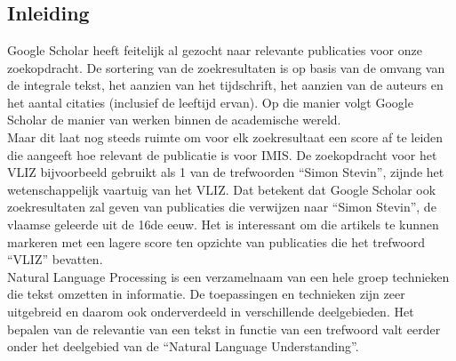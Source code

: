 
\chapter{}%
\label{ch:natural_language_processing}

\section{Inleiding}
Google Scholar heeft feitelijk al gezocht naar relevante publicaties voor onze zoekopdracht. De sortering van de zoekresultaten is op basis van de omvang van de integrale tekst, het aanzien van het tijdschrift, het aanzien van de auteurs en het aantal citaties (inclusief de leeftijd ervan). Op die manier volgt Google Scholar de manier van werken binnen de academische wereld.\\
Maar dit laat nog steeds ruimte om voor elk zoekresultaat een score af te leiden die aangeeft hoe relevant de publicatie is voor IMIS. De zoekopdracht voor het VLIZ bijvoorbeeld gebruikt als 1 van de trefwoorden ``Simon Stevin'', zijnde het wetenschappelijk vaartuig van het VLIZ. Dat betekent dat Google Scholar ook zoekresultaten zal geven van publicaties die verwijzen naar ``Simon Stevin'', de vlaamse geleerde uit de 16de eeuw. Het is interessant om die artikels te kunnen markeren met een lagere score ten opzichte van publicaties die het trefwoord ``VLIZ'' bevatten.\\
Natural Language Processing is een verzamelnaam van een hele groep technieken die tekst omzetten in informatie. De toepassingen en technieken zijn zeer uitgebreid en daarom ook onderverdeeld in verschillende deelgebieden. Het bepalen van de relevantie van een tekst in functie van een trefwoord valt eerder onder het deelgebied van de ``Natural Language Understanding''.\\


